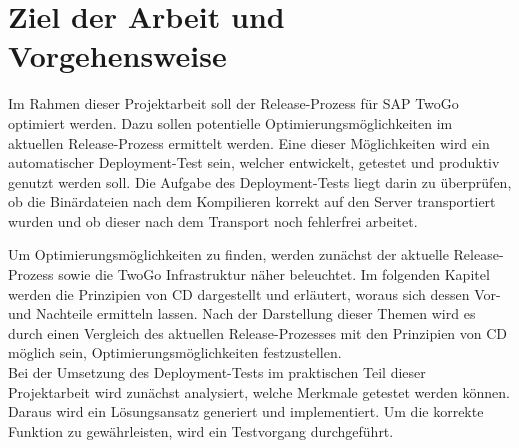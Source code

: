 \section{Ziel der Arbeit und Vorgehensweise}
Im Rahmen  dieser Projektarbeit soll der Release-Prozess für SAP TwoGo optimiert werden. Dazu sollen potentielle Optimierungsmöglichkeiten im aktuellen Release-Prozess ermittelt werden. Eine dieser Möglichkeiten wird ein automatischer Deployment-Test sein, welcher entwickelt, getestet und produktiv genutzt werden soll. Die Aufgabe des Deployment-Tests liegt darin zu überprüfen, ob die Binärdateien nach dem Kompilieren korrekt auf den Server transportiert wurden und ob dieser nach dem Transport noch fehlerfrei arbeitet.   

Um Optimierungsmöglichkeiten zu finden, werden zunächst der aktuelle Release-Prozess sowie die TwoGo Infrastruktur näher beleuchtet. Im folgenden Kapitel werden die Prinzipien von \acs{CD} dargestellt und erläutert, woraus sich dessen Vor- und Nachteile ermitteln lassen. Nach der Darstellung dieser Themen wird es durch einen Vergleich des aktuellen Release-Prozesses mit den Prinzipien von \acs{CD} möglich sein, Optimierungsmöglichkeiten festzustellen.\\
Bei der Umsetzung des Deployment-Tests im praktischen Teil dieser Projektarbeit wird zunächst analysiert, welche Merkmale getestet werden können. Daraus wird ein Lösungsansatz generiert und implementiert. Um die korrekte Funktion zu gewährleisten, wird  ein Testvorgang durchgeführt.   